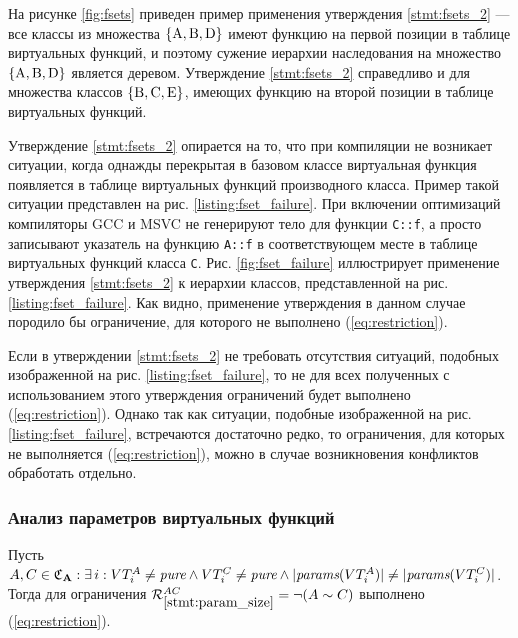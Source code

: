 На рисунке \ref{fig:fsets} приведен пример применения утверждения \ref{stmt:fsets_2} --- все классы из множества $\{\text{\lstinline{A}}, \text{\lstinline{B}}, \text{\lstinline{D}}\}$ имеют функцию  на первой позиции в таблице виртуальных функций, и поэтому сужение иерархии наследования на множество $\{\text{\lstinline{A}}, \text{\lstinline{B}}, \text{\lstinline{D}}\}$ является деревом. Утверждение \ref{stmt:fsets_2} справедливо и для множества классов $\{\text{\lstinline{B}}, \text{\lstinline{C}}, \text{\lstinline{E}}\}$, имеющих функцию  на второй позиции в таблице виртуальных функций.

Утверждение \ref{stmt:fsets_2} опирается на то, что при компиляции не возникает ситуации, когда однажды перекрытая в базовом классе виртуальная функция появляется в таблице виртуальных функций производного класса. Пример такой ситуации представлен на рис. \ref{listing:fset_failure}. При включении оптимизаций компиляторы GCC и MSVC не генерируют тело для функции \lstinline{C::f}, а просто записывают указатель на функцию \lstinline{A::f} в соответствующем месте в таблице виртуальных функций класса \lstinline{C}. Рис. \ref{fig:fset_failure} иллюстрирует применение утверждения \ref{stmt:fsets_2} к иерархии классов, представленной на рис. \ref{listing:fset_failure}. Как видно, применение утверждения в данном случае породило бы ограничение, для которого не выполнено (\ref{eq:restriction}).

Если в утверждении \ref{stmt:fsets_2} не требовать отсутствия ситуаций, подобных изображенной на рис. \ref{listing:fset_failure}, то не для всех полученных с использованием этого утверждения ограничений будет выполнено (\ref{eq:restriction}). Однако так как ситуации, подобные изображенной на рис. \ref{listing:fset_failure}, встречаются достаточно редко, то ограничения, для которых не выполняется (\ref{eq:restriction}), можно в случае возникновения конфликтов обработать отдельно.



\subsubsection{Анализ параметров виртуальных функций}\label{chapter:param_analysis}
\begin{statement}\label{stmt:param_size}
Пусть $A, C \in \mathfrak{C}_{\mathbf{A}}: \exists \, i: VT^A_i \ne \textit{pure} \wedge VT^C_i \ne \textit{pure} \wedge |\textit{params}(VT^A_i)| \ne |\textit{params}(VT^C_i)|$. Тогда для ограничения $\mathcal{R}_{\ref{stmt:param_size}}^{AC} = \neg (A \sim C)$ выполнено (\ref{eq:restriction}).
\end{statement}

